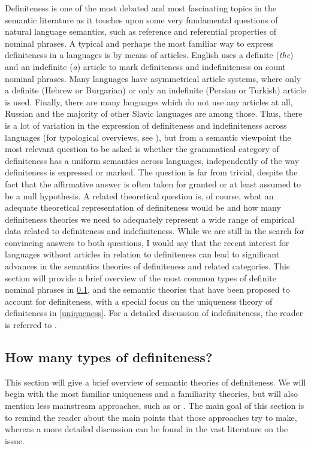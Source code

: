 \documentclass[output=paper,colorlinks,citecolor=brown]{langscibook}
\begin{document}
Definiteness is one of the most debated and most fascinating topics in the semantic literature as it touches upon some very fundamental questions of natural language semantics, such as reference and referential properties of nominal phrases. A typical and perhaps the most familiar way to express definiteness in a languages is by means of articles. English uses a definite (\textit{the}) and an indefinite (\textit{a}) article to mark definiteness and indefiniteness on count nominal phrases. Many languages have asymmetrical article systems, where only a definite (Hebrew or Burgarian) or only an indefinite (Persian or Turkish) article is used. Finally, there are many languages which do not use any articles at all, Russian and the majority of other Slavic languages are among those. Thus, there is a lot of variation in the expression of definiteness and indefiniteness across languages (for typological overviews, see \citealt{dryer05, dryer13, givon78}), but from a semantic viewpoint the most relevant question to be asked is whether the grammatical category of definiteness has a uniform semantics across languages, independently of the way definiteness is expressed or marked. The question is far from trivial, despite the fact that the affirmative answer is often taken for granted or at least assumed to be a null hypothesis. A related theoretical question is, of course, what an adequate theoretical representation of definiteness would be and how many definiteness theories we need to adequately represent a wide range of empirical data related to definiteness and indefiniteness. While we are still in the search for convincing answers to both questions, I would say that the recent interest for languages without articles in relation to definiteness can lead to significant advances in the semantics theories of definiteness and related categories. This section will provide a brief overview of the most common types of definite nominal phrases in \ref{howmanydef}, and the semantic theories that have been proposed to account for definiteness, with a special focus on the uniqueness theory of definiteness in \ref{uniqueness}. For a detailed discussion of indefiniteness, the reader is referred to .

\subsection{How many types of definiteness?} \label{howmanydef}

This section will give a brief overview of semantic theories of definiteness. We will begin with the most familiar uniqueness and a familiarity theories, but will also mention less mainstream approaches, such as \citet{heusinger13} or \citet{lobner85}. The main goal of this section is to remind the reader about the main points that those approaches try to make, whereas a more detailed discussion can be found in the vast literature on the issue. 
\end{document}
